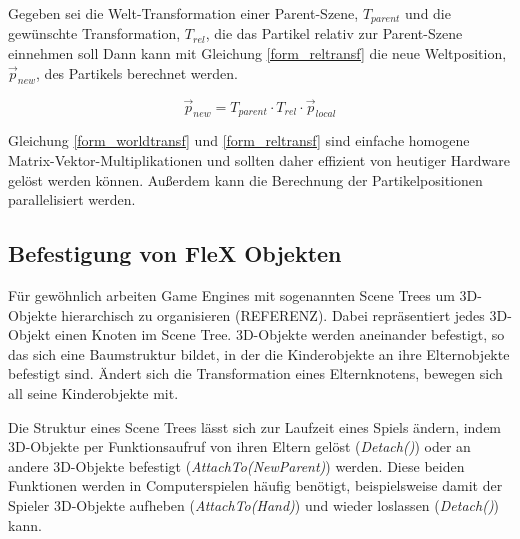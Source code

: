 
Gegeben sei die Welt-Transformation einer Parent-Szene, $T_{parent}$ und die gewünschte Transformation, $T_{rel}$, die das Partikel relativ zur Parent-Szene einnehmen soll 
Dann kann mit Gleichung \ref{form_reltransf} die neue Weltposition, $\vec{p}_{new}$, des Partikels berechnet werden.

\begin{equation}
\vec{p}_{new} = T_{parent} \cdot T_{rel} \cdot \vec{p}_{local}
\label{form_reltransf}
\end{equation}

Gleichung \ref{form_worldtransf} und \ref{form_reltransf} sind einfache homogene Matrix-Vektor-Multiplikationen und sollten daher effizient von heutiger Hardware gelöst werden können. Außerdem kann die Berechnung der Partikelpositionen parallelisiert werden.

\subsection{Befestigung von FleX Objekten}
\label{subsec_attach}




Für gewöhnlich arbeiten Game Engines mit sogenannten Scene Trees um 3D-Objekte hierarchisch zu organisieren (REFERENZ). Dabei repräsentiert jedes 3D-Objekt einen Knoten im Scene Tree. 3D-Objekte werden aneinander befestigt, so das sich eine Baumstruktur bildet, in der die Kinderobjekte an ihre Elternobjekte befestigt sind. Ändert sich die Transformation eines Elternknotens, bewegen sich all seine Kinderobjekte mit. 


Die Struktur eines Scene Trees lässt sich zur Laufzeit eines Spiels ändern, indem 3D-Objekte per Funktionsaufruf von ihren Eltern gelöst (\textit{Detach()}) oder an andere 3D-Objekte befestigt (\textit{AttachTo(NewParent)}) werden. Diese beiden Funktionen werden in Computerspielen häufig benötigt, beispielsweise damit der Spieler 3D-Objekte aufheben (\textit{AttachTo(Hand)}) und wieder loslassen (\textit{Detach()}) kann.

